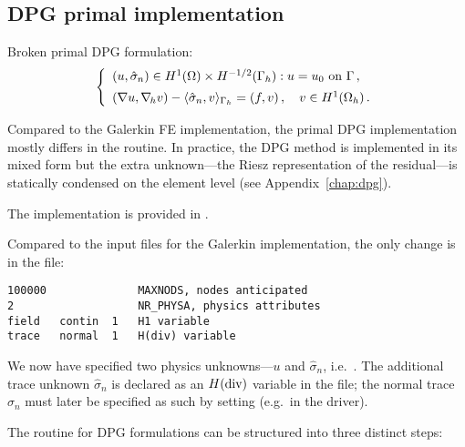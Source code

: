 \subsection{DPG primal implementation}
\label{sec:poisson-primal}

Broken primal DPG formulation:
\[
\left\{
\begin{array}{llll}
	(u, \hat \sigma_n) \in H^1(\Omega) \times H^{-1/2}(\Gamma_h): u = u_0 \text{ on } \Gamma \, , \\[5pt]
	(\nabla u, \nabla_{\hskip -1pt h} v) - \langle \hat \sigma_n , v \rangle_{\Gamma_h} 
	= (f,v) \, ,\quad v \in H^1(\Omega_h) \, .
\end{array}
\right.
\]

Compared to the Galerkin FE implementation, the primal DPG implementation mostly differs in the  routine. In practice, the DPG method is implemented in its mixed form \cite{demkowicz2017dpg} but the extra unknown---the Riesz representation of the residual---is statically condensed on the element level (see Appendix~\ref{chap:dpg}).

The implementation is provided in .

Compared to the input files for the Galerkin implementation, the only change is in the  file:
\begin{lstlisting}[caption=\file{POISSON/PRIMAL\_DPG/input/physics} input file.]
100000              MAXNODS, nodes anticipated
2                   NR_PHYSA, physics attributes
field   contin  1   H1 variable
trace   normal  1   H(div) variable
\end{lstlisting}
We now have specified two physics unknowns---$u$ and $\hat \sigma_n$, i.e.~. The additional trace unknown $\hat \sigma_n$ is declared as an $H(\text{div})$ variable in the  file; the normal trace $\hat \sigma_n$ must later be specified as such by setting  (e.g.~in the  driver).

The  routine for DPG formulations can be structured into three distinct steps:
\vskip 5pt

